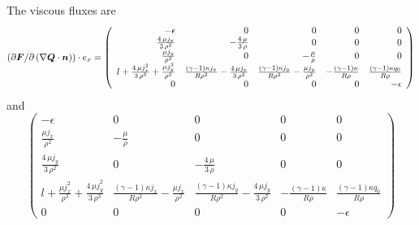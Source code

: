 The viscous fluxes are
\begin{equation}
\left( \partial \bm{F}/\partial \left( \nabla \bm{Q} \cdot \bm{n} \right)\right) \cdot e_x =  \left(\begin{array}{rrrrr}
-\epsilon & 0 & 0 & 0 & 0 \\
\frac{4 \, \mu j_{x}}{3 \, \rho^{2}} & -\frac{4 \, \mu}{3 \, \rho} & 0 & 0 & 0 \\
\frac{\mu j_{y}}{\rho^{2}} & 0 & -\frac{\mu}{\rho} & 0 & 0 \\
l + \frac{4 \, \mu j_{x}^{2}}{3 \, \rho^{3}} + \frac{\mu j_{y}^{2}}{\rho^{3}} & \frac{{\left(\gamma - 1\right)} \kappa j_{x}}{R \rho^{2}} - \frac{4 \, \mu j_{x}}{3 \, \rho^{2}} & \frac{{\left(\gamma - 1\right)} \kappa j_{y}}{R \rho^{2}} - \frac{\mu j_{y}}{\rho^{2}} & -\frac{{\left(\gamma - 1\right)} \kappa}{R \rho} & \frac{{\left(\gamma - 1\right)} \kappa q_{0}}{R \rho} \\
0 & 0 & 0 & 0 & -\epsilon
\end{array}\right)
\end{equation}
and
\begin{equation}
  \left(\begin{array}{rrrrr}
-\epsilon & 0 & 0 & 0 & 0 \\
\frac{\mu j_{x}}{\rho^{2}} & -\frac{\mu}{\rho} & 0 & 0 & 0 \\
\frac{4 \, \mu j_{y}}{3 \, \rho^{2}} & 0 & -\frac{4 \, \mu}{3 \, \rho} & 0 & 0 \\
l + \frac{\mu j_{x}^{2}}{\rho^{3}} + \frac{4 \, \mu j_{y}^{2}}{3 \, \rho^{3}} & \frac{{\left(\gamma - 1\right)} \kappa j_{x}}{R \rho^{2}} - \frac{\mu j_{x}}{\rho^{2}} & \frac{{\left(\gamma - 1\right)} \kappa j_{y}}{R \rho^{2}} - \frac{4 \, \mu j_{y}}{3 \, \rho^{2}} & -\frac{{\left(\gamma - 1\right)} \kappa}{R \rho} & \frac{{\left(\gamma - 1\right)} \kappa q_{0}}{R \rho} \\
0 & 0 & 0 & 0 & -\epsilon
\end{array}\right)
\end{equation}
